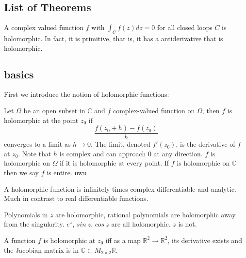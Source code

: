 \documentclass[main.tex]{subfiles}
\begin{document}
\subsection{List of Theorems}

\begin{theorem}
A complex valued function $f$ with $\int_C f(z) dz = 0$ for all closed loops $C$ is holomorphic. In fact, it is primitive, that is, it has a antiderivative that is holomorphic.
\end{theorem}

\subsection{basics}

First we introduce the notion of holomorphic functions:

\begin{definition}
Let $\Omega$ be an open subset in $\mathbb{C}$ and $f$ complex-valued function on $\Omega$, then $f$ is holomorphic at the point $z_0$ if 
$$
\frac{f(z_0 + h) - f(z_0)}{h}
$$
converges to a limit as $h \rightarrow 0$. The limit, denoted $f'(z_0)$, is the derivative of $f$ at $z_0$. Note that $h$ is complex and can approach $0$ at any direction. $f$ is holomorphic on $\Omega$ if it is holomorphic at every point. If $f$ is holomorphic on $\mathbb{C}$ then we say $f$ is entire. uwu
\end{definition}

\begin{remark}
A holomorphic function is infinitely times complex differentiable and analytic. Much in contrast to real differentiable functions.
\end{remark}

\begin{example} 
Polynomials in $z$ are holomorphic, rational polynomials are holomorphic away from the singularity. $e^z$, $sin \ z$, $cos \ z$ are all holomorphic. $\overline{z}$ is not. 
\end{example}

A function $f$ is holomorphic at $z_0$ iff as a map $\mathbb{R}^2 \rightarrow \mathbb{R}^2$, its derivative exists and the Jacobian matrix is in $\mathbb{C} \subset M_{2 \times 2}\mathbb{R}$.
\end{document}
